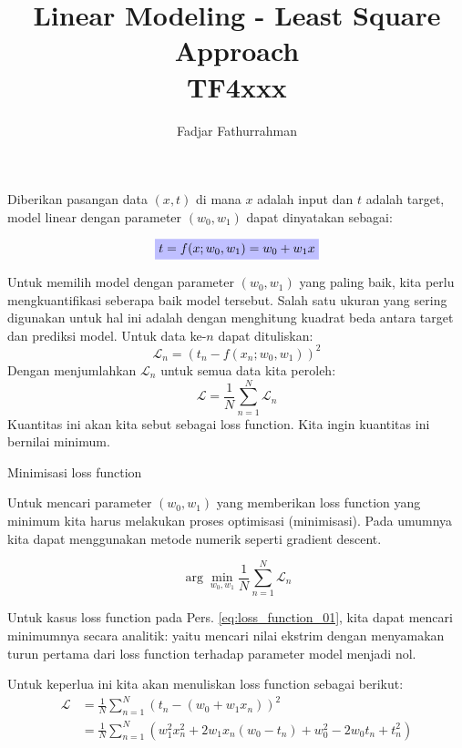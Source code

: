 \documentclass[a4paper,12pt]{article} %
\newcommand{\highlighteq}[1]{\colorbox{blue!25}{$\displaystyle#1$}}
\newcommand{\highlight}[1]{\colorbox{red!25}{#1}}
\begin{document}
\title{Linear Modeling - Least Square Approach \\
TF4xxx}
\author{Fadjar Fathurrahman}
\date{}
\maketitle

Diberikan pasangan data $(x,t)$ di mana $x$ adalah input dan $t$
adalah target, model linear dengan parameter $(w_0, w_1)$ dapat
dinyatakan sebagai:

\begin{equation}
\highlighteq{
t = f(x; w_0, w_1) = w_0 + w_1 x
}
\label{eq:model_linear_01}
\end{equation}

Untuk memilih model dengan parameter \((w_0, w_1)\) yang paling baik,
kita perlu mengkuantifikasi seberapa baik model tersebut. Salah satu ukuran
yang sering digunakan untuk hal ini adalah dengan menghitung kuadrat beda antara
target dan prediksi model. Untuk data ke-$n$ dapat dituliskan:
$$
\mathcal{L}_n = \left( t_n - f(x_n; w_0, w_1) \right)^2
$$
%
Dengan menjumlahkan $\mathcal{L}_{n}$ untuk semua data kita peroleh:
\begin{equation}
\mathcal{L} = \frac{1}{N} \sum_{n=1}^{N} \mathcal{L}_n
\label{eq:loss_function_01}
\end{equation}
Kuantitas ini akan kita sebut sebagai \highlight{loss function}.
Kita ingin kuantitas ini bernilai minimum.


Minimisasi loss function

Untuk mencari parameter $(w_{0},w_{1})$ yang memberikan loss function yang minimum
kita harus melakukan proses optimisasi (minimisasi). Pada umumnya kita dapat menggunakan
metode numerik seperti gradient descent.

$$
\arg\min_{w_{0},w_{1}} \frac{1}{N} \sum_{n=1}^{N} \mathcal{L}_{n}
$$

Untuk kasus loss function pada Pers. \eqref{eq:loss_function_01}, kita dapat mencari
minimumnya secara analitik: yaitu mencari nilai ekstrim dengan menyamakan turun pertama
dari loss function terhadap parameter model menjadi nol.

Untuk keperlua ini kita akan menuliskan loss function sebagai berikut:
\begin{align*}
\mathcal{L} & = \frac{1}{N} \sum_{n=1}^{N} \left( t_n - (w_0 + w_1 x_{n}) \right)^2 \\
& = \frac{1}{N} \sum_{n=1}^{N} \left( w_1^2 x_n^2 + 2w_{1}x_{n}(w_0 - t_n) + w_0^2 - 2w_0 t_n + t_n^2 \right)
\end{align*}
\end{document}
